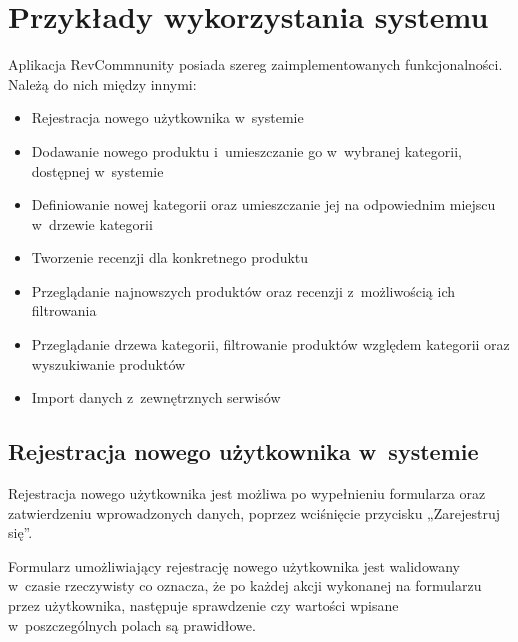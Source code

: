 \chapter{Przykłady wykorzystania systemu}

Aplikacja RevCommnunity posiada szereg zaimplementowanych funkcjonalności. Należą do nich między innymi:

\begin{itemize}
\item Rejestracja nowego użytkownika w~systemie
\item Dodawanie nowego produktu i~umieszczanie go w~wybranej kategorii, dostępnej w~systemie
\item Definiowanie nowej kategorii oraz umieszczanie jej na odpowiednim miejscu w~drzewie kategorii
\item Tworzenie recenzji dla konkretnego produktu
\item Przeglądanie najnowszych produktów oraz recenzji z~możliwością ich filtrowania
\item Przeglądanie drzewa kategorii, filtrowanie produktów względem kategorii oraz wyszukiwanie produktów
\item Import danych z~zewnętrznych serwisów
\end{itemize}

\section{Rejestracja nowego użytkownika w~systemie}

Rejestracja nowego użytkownika jest możliwa po wypełnieniu formularza oraz zatwierdzeniu wprowadzonych danych, poprzez wciśnięcie przycisku „Zarejestruj się”.

Formularz umożliwiający rejestrację nowego użytkownika jest walidowany w~czasie rzeczywisty co oznacza, że po każdej akcji wykonanej na formularzu przez użytkownika, następuje sprawdzenie czy wartości wpisane w~poszczególnych polach są prawidłowe.

